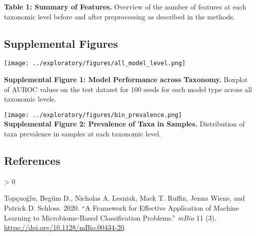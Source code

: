 \documentclass[
]{article}
\newlength{\cslhangindent}
\newenvironment{CSLReferences}[2] %
 {%
  \setlength{\parindent}{0pt}
  \ifodd #1 \everypar{\setlength{\hangindent}{\cslhangindent}}\ignorespaces\fi
  \ifnum #2 > 0
  \setlength{\parskip}{#2\baselineskip}
  \fi
 }%
 {}
\begin{document}
\textbf{Table 1: Summary of Features.} Overview of the number of
features at each taxonomic level before and after preprocessing as
described in the methods.

\newpage

\hypertarget{supplemental-figures}{%
\subsection{Supplemental Figures}\label{supplemental-figures}}

\texttt{[image: ../exploratory/figures/all\_model\_level.png]}

\textbf{Supplemental Figure 1: Model Performance across Taxonomy.}
Boxplot of AUROC values on the test dataset for 100 seeds for each model
type across all taxonomic levels.

\texttt{[image: ../exploratory/figures/bin\_prevalence.png]}\\
\textbf{Supplemental Figure 2: Prevalence of Taxa in Samples.}
Distribution of taxa prevalence in samples at each taxonomic level.

\hypertarget{references}{%
\subsection*{References}\label{references}}

\hypertarget{refs}{}
\begin{CSLReferences}{1}{0}
\leavevmode\hypertarget{ref-topuxe7uolu2020}{}%
Topçuoğlu, Begüm D., Nicholas A. Lesniak, Mack T. Ruffin, Jenna Wiens,
and Patrick D. Schloss. 2020. {``A Framework for Effective Application
of Machine Learning to Microbiome-Based Classification Problems.''}
\emph{mBio} 11 (3). \url{https://doi.org/10.1128/mBio.00434-20}.

\end{CSLReferences}
\end{document}
